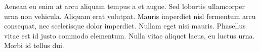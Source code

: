 Aenean eu enim at arcu aliquam tempus a et augue. Sed lobortis ullamcorper urna non vehicula. Aliquam erat volutpat. Mauris imperdiet nisl fermentum arcu consequat, nec scelerisque dolor imperdiet. Nullam eget nisi mauris. Phasellus vitae est id justo commodo elementum. Nulla vitae aliquet lacus, eu luctus urna. Morbi id tellus dui.